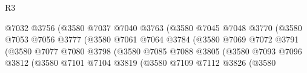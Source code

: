 \begin{lexlean}{R3}
\begin{coremodule}
                                            @7032
                                            @3756
                                            (@3580
                                              @7037
                                              @7040
                                              @3763
                                              (@3580
                                                @7045
                                                @7048
                                                @3770
                                                (@3580
                                                  @7053
                                                  @7056
                                                  @3777
                                                  (@3580
                                                    @7061
                                                    @7064
                                                    @3784
                                                    (@3580
                                                      @7069
                                                      @7072
                                                      @3791
                                                      (@3580
                                                        @7077
                                                        @7080
                                                        @3798
                                                        (@3580
                                                          @7085
                                                          @7088
                                                          @3805
                                                          (@3580
                                                            @7093
                                                            @7096
                                                            @3812
                                                            (@3580
                                                              @7101
                                                              @7104
                                                              @3819
                                                              (@3580
                                                                @7109
                                                                @7112
                                                                @3826
                                                                (@3580

\end{coremodule}
\end{lexlean}
